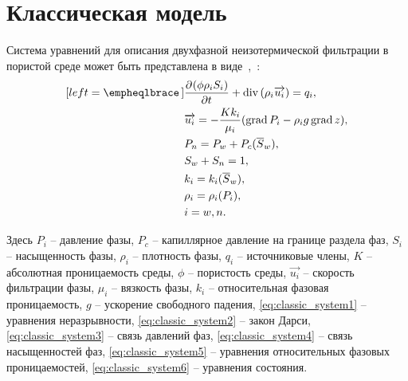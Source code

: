 \newcommand*{\pd}[3][]{\ensuremath{\dfrac{\partial^{#1} #2}{\partial #3^{#1}}}}
\newcommand*{\dd}[3][]{\ensuremath{\dfrac{\mathrm d^{#1} #2}{\mathrm d #3^{#1}}}}
\newcommand{\grad}{\mathop{\mathrm{grad}}\nolimits}
\newcommand{\diver}{\mathop{\mathrm{div}}\nolimits}

\section{Классическая модель}
\label{classic_model}
Система уравнений для описания двухфазной неизотермической фильтрации в пористой среде
может быть представлена в виде~\cite{Aziz-Settari},~\cite{Basniev}:
\begin{subequations} \label{eq:classic_system}
  \begin{align}[left = \empheqlbrace\,]
    &\pd {(\phi \rho_i S_i)}{t} + \diver{(\rho_i \overrightarrow{u_i})} = q_i, \label{eq:classic_system1} \\
    &\overrightarrow{u_i} = -\frac{K k_i}{\mu_i}(\grad {P_i} - {\rho}_i g \grad {z}), \label{eq:classic_system2} \\
    &P_n = P_w + P_{c}(\overline{S}_w), \label{eq:classic_system3} \\
    &S_w + S_n = 1, \label{eq:classic_system4} \\
    &k_i = k_i(\overline{S}_w), \label{eq:classic_system5} \\
    &\rho_i = \rho_i(P_i), \label{eq:classic_system6} \\
    &i = w,n \nonumber .
  \end{align}
\end{subequations}

Здесь 
$P_i$ -- давление фазы,
$P_c$ -- капиллярное давление на границе раздела фаз,
$S_i$ -- насыщенность фазы,
${\rho}_i$ -- плотность фазы,
$q_i$ -- источниковые члены,
$K$ -- абсолютная проницаемость среды,
$\phi$ -- пористость среды,
$\overrightarrow{u_i}$ -- скорость фильтрации фазы,
$\mu_i$ -- вязкость фазы,
$k_i$ -- относительная фазовая проницаемость,
$g$ -- ускорение свободного падения,
\eqref{eq:classic_system1} -- уравнения неразрывности,
\eqref{eq:classic_system2} -- закон Дарси,
\eqref{eq:classic_system3} -- связь давлений фаз,
\eqref{eq:classic_system4} -- связь насыщенностей фаз,
\eqref{eq:classic_system5} -- уравнения относительных фазовых проницаемостей,
\eqref{eq:classic_system6} -- уравнения состояния.

\newpage
\pagestyle{fancy} %
\fancyhf{} %
\fancyhead[C]{\thepage} %
\renewcommand{\headrulewidth}{0pt} %

